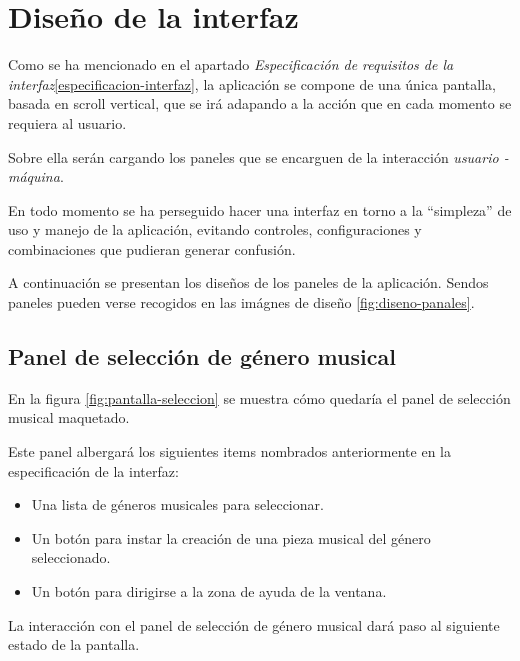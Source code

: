\chapter{Diseño de la interfaz}

Como se ha mencionado en el apartado \emph{Especificación de requisitos de la interfaz}\ref{especificacion-interfaz}, la aplicación se compone de una única pantalla, basada en scroll vertical, que se irá adapando a la acción que en cada momento se requiera al usuario.

Sobre ella serán cargando los paneles que se encarguen de la interacción \emph{usuario - máquina}.

En todo momento se ha perseguido hacer una interfaz en torno a la ``simpleza'' de uso y manejo de la aplicación, evitando controles, configuraciones y combinaciones que pudieran generar confusión.

A continuación se presentan los diseños de los paneles de la aplicación. Sendos paneles pueden verse recogidos en las imágnes de diseño \ref{fig:diseno-panales}.

\section{Panel de selección de género musical}

En la figura \ref{fig:pantalla-seleccion} se muestra cómo quedaría el panel de selección musical maquetado.


Este panel albergará los siguientes items nombrados anteriormente en la especificación de la interfaz:

\begin{itemize}
    \item Una lista de géneros musicales para seleccionar.
    \item Un botón para instar la creación de una pieza musical del género seleccionado.
    \item Un botón para dirigirse a la zona de ayuda de la ventana.
\end{itemize}

La interacción con el panel de selección de género musical dará paso al siguiente estado de la pantalla.

